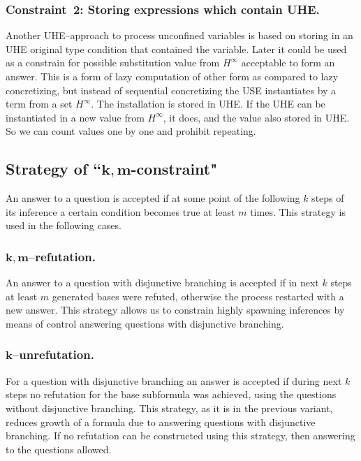 \documentclass[runningheads,a4paper]{llncs}
\begin{document}
\subsubsection{Constraint~2: Storing expressions which contain UHE.}

Another UHE--approach to process unconfined variables is based on storing in an UHE original type condition that contained the variable.  Later it could be used as a constrain for possible substitution value from $H^{\infty}$ acceptable to form an answer. This is a form of lazy computation of other form as compared to lazy concretizing, but instead of sequential concretizing the USE instantiates by a term from a set $H^{\infty}$. The installation is stored in UHE. If the UHE can be instantiated in a new value from $H^{\infty}$, it does, and the value also stored in UHE. So we can count values one by one and prohibit repeating.


\subsection{Strategy of ``$\boldsymbol{k,m}$-constraint"}
An answer to a question is accepted if at some point of the following $k$ steps of its inference a certain condition becomes true at least $m$ times. This strategy is used in the following cases.

\subsubsection{$\boldsymbol{k,m}$--refutation.} An answer to a question with disjunctive branching is accepted if in next $k$ steps at least $m$ generated bases were refuted, otherwise the process restarted with a new answer. This strategy allows us to constrain highly spawning inferences by means of control answering questions with disjunctive branching.

\subsubsection{$\boldsymbol{k}$--unrefutation.}
For a question with disjunctive branching an answer is accepted if during next $k$ steps no refutation for the base subformula was achieved, using the questions without disjunctive branching. This strategy, as it is in the previous variant, reduces growth of a formula due to answering questions with disjunctive branching. If no refutation can be constructed using this strategy, then answering to the questions allowed.
\end{document}
